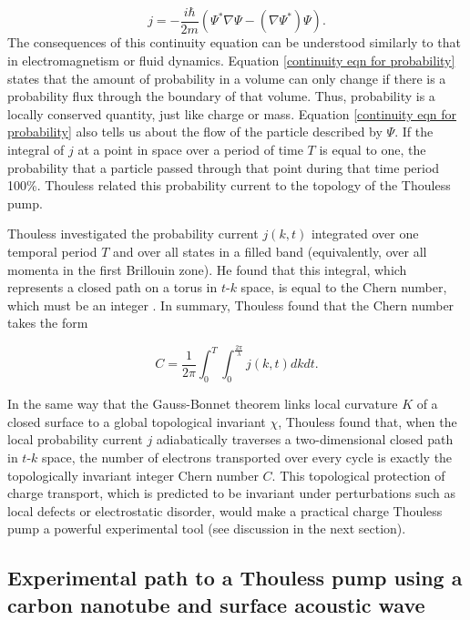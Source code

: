 \documentclass[double,12pt,1in,seploa]{beavtex}
\let\Oldsubsection\subsection
\renewcommand{\subsection}{\FloatBarrier\Oldsubsection}
\begin{document}
\begin{equation}
    j = -\frac{i \hbar}{2 m}\left(\Psi^* \nabla \Psi - (\nabla \Psi^*)\Psi\right). 
\end{equation}
The consequences of this continuity equation can be understood similarly to that in electromagnetism or fluid dynamics. Equation \ref{continuity eqn for probability} states that the amount of probability in a volume can only change if there is a probability flux through the boundary of that volume. Thus, probability is a locally conserved quantity, just like charge or mass. Equation \ref{continuity eqn for probability} also tells us about the flow of the particle described by $\Psi$. If the integral of $j$ at a point in space over a period of time $T$ is equal to one, the probability that a particle passed through that point during that time period 100\%. Thouless related this probability current to the topology of the Thouless pump.

Thouless investigated the probability current $j(k,t)$ integrated over one temporal period $T$ and over all states in a filled band (equivalently, over all momenta in the first Brillouin zone). He found that this integral, which represents a closed path on a torus in $t \textrm{-} k$ space, is equal to the Chern number, which must be an integer \cite{thouless_quantization_1983}. In summary, Thouless found that the Chern number takes the form

\begin{equation}
    C = \frac{1}{2\pi} \int_{0}^{T} \int_{0}^{\frac{2\pi}{\lambda}} j(k,t) dkdt. \label{Thouless Chern equation}
\end{equation}

In the same way that the Gauss-Bonnet theorem links local curvature $K$ of a closed surface to a global topological invariant $\chi$, Thouless found that, when the local probability current $j$ adiabatically traverses a two-dimensional closed path in $t\textrm{-}k$ space, the number of electrons transported over every cycle is exactly the topologically invariant integer Chern number $C$. This topological protection of charge transport, which is predicted to be invariant under perturbations such as local defects or electrostatic disorder, would make a practical charge Thouless pump a powerful experimental tool (see discussion in the next section).

\subsection{Experimental path to a Thouless pump using a carbon nanotube and surface acoustic wave} 
\end{document}
